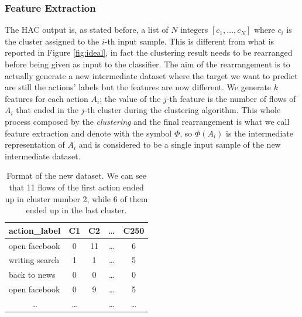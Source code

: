 \subsubsection{Feature Extraction}
\label{subsubsec:fexc}
The HAC output is, as stated before, a list of $N$ integers $[c_1,\dots, c_N]$ where $c_i$ is the cluster assigned to the $i$-th input sample. This is different from what is reported in Figure \ref{fig:ideal}, in fact the clustering result needs to be rearranged before being given as input to the classifier. The aim of the rearrangement is to actually generate a new intermediate dataset where the target we want to predict are still the actions' labels but the features are now different. We generate $k$ features for each action $A_i$; the value of the $j$-th feature is the number of flows of $A_i$ that ended in the $j$-th cluster during the clustering algorithm. This whole process composed by the \textit{clustering} and the final rearrangement is what we call feature extraction and denote with the symbol $\Phi$, so $\Phi(A_i)$ is the intermediate representation of $A_i$ and is considered to be a single input sample of the new intermediate dataset.

\begin{table}[]
\label{tab:newdataset}
\centering
\begin{tabular}{@{}lcccc@{}}
\toprule
\textbf{action\_label}     & \multicolumn{1}{l}{\textbf{C1}} & \multicolumn{1}{l}{\textbf{C2}} & \multicolumn{1}{l}{\textbf{\dots}} & \multicolumn{1}{l}{\textbf{C250}} \\ \midrule
open facebook              & 0                               & 11                              & \dots                              & 6                                \\
writing search             & 1                               & 1                               & \dots                              & 5                                \\
back to news               & 0                               & 0                               & \dots                              & 0                                \\
open facebook              & 0                               & 9                               & \dots                              & 5                                \\
\multicolumn{1}{c}{\dots} & \dots                          &                                 & \dots                             & \dots                           \\ \bottomrule
\end{tabular}
\caption{\small{Format of the new dataset. We can see that 11 flows of the first action ended up in cluster number 2, while 6 of them ended up in the last cluster.}}
\end{table}

